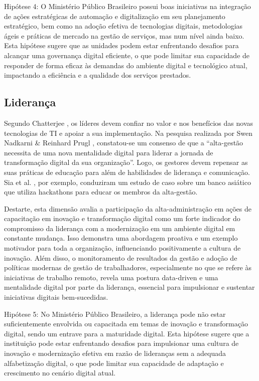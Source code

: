  Hipótese 4: O Ministério Público Brasileiro possui boas iniciativas na integração de ações estratégicas de automação e digitalização em seu planejamento estratégico, bem como na adoção efetiva de tecnologias digitais, metodologias ágeis e práticas de mercado na gestão de serviços, mas num nível ainda baixo. Esta hipótese sugere que as unidades podem estar enfrentando desafios para alcançar uma governança digital eficiente, o que pode limitar sua capacidade de responder de forma eficaz às demandas do ambiente digital e tecnológico atual, impactando a eficiência e a qualidade dos serviços prestados.
 
 \subsection{Liderança}

 Segundo Chatterjee \cite{chatterjee2002shaping}, os líderes devem confiar no valor e nos benefícios das novas tecnologias de TI e apoiar a sua implementação. Na pesquisa realizada por Swen Nadkarni \& Reinhard Prugl \cite{nadkarni2021digital}, constatou-se um consenso de que a “alta-gestão necessita de uma nova mentalidade digital para liderar a jornada de transformação digital da sua organização”. Logo, os gestores devem repensar as suas práticas de educação para além de habilidades de liderança e comunicação. Sia et al. \cite{sia2016dbs}, por exemplo, conduziram um estudo de caso sobre um banco asiático que utiliza hackathons para educar os membros da alta-gestão.

 Destarte, esta dimensão avalia a participação da alta-administração em ações de capacitação em inovação e transformação digital como um forte indicador do compromisso da liderança com a modernização em um ambiente digital em constante mudança. Isso demonstra uma abordagem proativa e um exemplo motivador para toda a organização, influenciando positivamente a cultura de inovação. Além disso, o monitoramento de resultados da gestão e adoção de políticas modernas de gestão de trabalhadores, especialmente no que se refere às iniciativas de trabalho remoto, revela uma postura data-driven e uma mentalidade digital por parte da liderança, essencial para impulsionar e sustentar iniciativas digitais bem-sucedidas.

 Hipótese 5: No Ministério Público Brasileiro, a liderança pode não estar suficientemente envolvida ou capacitada em temas de inovação e transformação digital, sendo um entrave para a maturidade digital. Esta hipótese sugere que a instituição pode estar enfrentando desafios para impulsionar uma cultura de inovação e modernização efetiva em razão de lideranças sem a adequada alfabetização digital, o que pode limitar sua capacidade de adaptação e crescimento no cenário digital atual.
 

